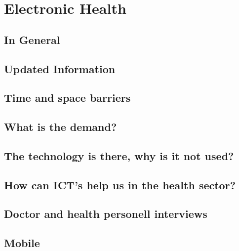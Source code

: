 \chapter{Electronic Health}

\section{In General}

\section{Updated Information}

\section{Time and space barriers}

\section{What is the demand?}

\section{The technology is there, why is it not used?}


\section{How can ICT's help us in the health sector?}

\section{Doctor and health personell interviews}

\section{Mobile}
